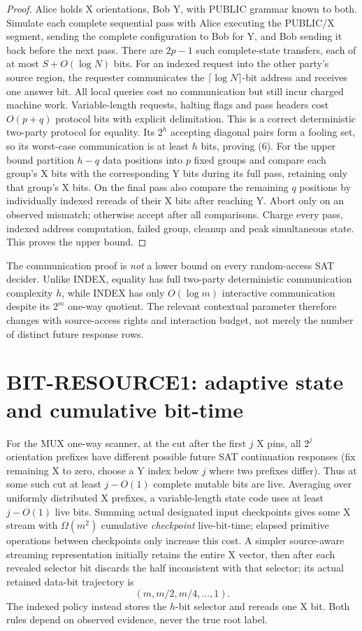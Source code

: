 \documentclass[11pt]{article}
\begin{document}
\begin{proof}
Alice holds X orientations, Bob Y, with PUBLIC grammar known to both. Simulate each complete sequential pass with Alice executing the PUBLIC/X segment, sending the complete configuration to Bob for Y, and Bob sending it back before the next pass. There are $2p-1$ such complete-state transfers, each of at most $S+O(\log N)$ bits. For an indexed request into the other party's source region, the requester communicates the $\lceil\log N\rceil$-bit address and receives one answer bit. All local queries cost no communication but still incur charged machine work. Variable-length requests, halting flags and pass headers cost $O(p+q)$ protocol bits with explicit delimitation. This is a correct deterministic two-party protocol for equality. Its $2^h$ accepting diagonal pairs form a fooling set, so its worst-case communication is at least $h$ bits, proving (6).
For the upper bound partition $h-q$ data positions into $p$ fixed groups and compare each group's X bits with the corresponding Y bits during its full pass, retaining only that group's X bits. On the final pass also compare the remaining $q$ positions by individually indexed rereads of their X bits after reaching Y. Abort only on an observed mismatch; otherwise accept after all comparisons. Charge every pass, indexed address computation, failed group, cleanup and peak simultaneous state. This proves the upper bound.
\end{proof}
The communication proof is \emph{not} a lower bound on every random-access SAT decider. Unlike INDEX, equality has full two-party deterministic communication complexity $h$, while INDEX has only $O(\log m)$ interactive communication despite its $2^m$ one-way quotient. The relevant contextual parameter therefore changes with source-access rights and interaction budget, not merely the number of distinct future response rows.

\section{BIT-RESOURCE1: adaptive state and cumulative bit-time}
For the MUX one-way scanner, at the cut after the first $j$ X pins, all $2^j$ orientation prefixes have different possible future SAT continuation responses (fix remaining X to zero, choose a Y index below $j$ where two prefixes differ). Thus at some such cut at least $j-O(1)$ complete mutable bits are live. Averaging over uniformly distributed X prefixes, a variable-length state code uses at least $j-O(1)$ live bits. Summing actual designated input checkpoints gives some X stream with $\Omega(m^2)$ cumulative \emph{checkpoint} live-bit-time; elapsed primitive operations between checkpoints only increase this cost. A simpler source-aware streaming representation initially retains the entire X vector, then after each revealed selector bit discards the half inconsistent with that selector; its actual retained data-bit trajectory is
\[
 (m,m/2,m/4,\ldots,1).
\tag{7}
\]
The indexed policy instead stores the $h$-bit selector and rereads one X bit. Both rules depend on observed evidence, never the true root label.
\end{document}
